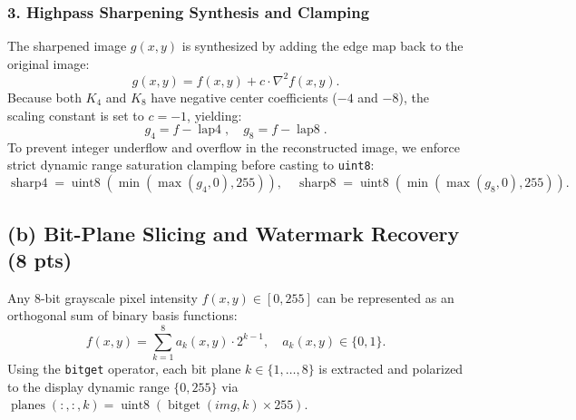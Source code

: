 \documentclass[11pt,a4paper]{article}
\begin{document}
\subsubsection{3. Highpass Sharpening Synthesis and Clamping}
The sharpened image $g(x, y)$ is synthesized by adding the edge map back to the original image:
\begin{equation}
g(x, y) = f(x, y) + c \cdot \nabla^2 f(x, y).
\end{equation}
Because both $K_4$ and $K_8$ have negative center coefficients ($-4$ and $-8$), the scaling constant is set to $c = -1$, yielding:
\begin{equation}
g_4 = f - \operatorname{lap4}, \quad g_8 = f - \operatorname{lap8}.
\end{equation}
To prevent integer underflow and overflow in the reconstructed image, we enforce strict dynamic range saturation clamping before casting to \texttt{uint8}:
\begin{equation}
\operatorname{sharp4} = \operatorname{uint8}\left(\min\left(\max(g_4, 0), 255\right)\right), \quad \operatorname{sharp8} = \operatorname{uint8}\left(\min\left(\max(g_8, 0), 255\right)\right).
\end{equation}

\subsection{(b) Bit-Plane Slicing and Watermark Recovery (8 pts)}
Any 8-bit grayscale pixel intensity $f(x, y) \in [0, 255]$ can be represented as an orthogonal sum of binary basis functions:
\begin{equation}
f(x, y) = \sum_{k=1}^8 a_k(x, y) \cdot 2^{k-1}, \quad a_k(x, y) \in \{0, 1\}.
\end{equation}
Using the \texttt{bitget} operator, each bit plane $k \in \{1, \dots, 8\}$ is extracted and polarized to the display dynamic range $\{0, 255\}$ via $\operatorname{planes}(:, :, k) = \operatorname{uint8}(\operatorname{bitget}(img, k) \times 255)$.

\vspace{0.8em}
\noindent{}
\vspace{0.8em}
\end{document}
